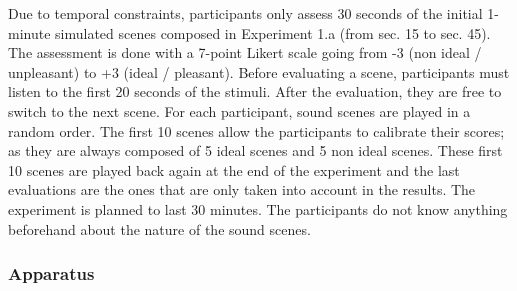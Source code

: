 \documentclass[twoside,twocolumn]{article}
\begin{document}
%
%
%

Due to temporal constraints, participants only assess 30 seconds of the initial 1-minute simulated scenes composed in Experiment 1.a (from sec. 15 to sec. 45).
The assessment is done with a 7-point Likert scale going from -3 (non ideal / unpleasant) to +3 (ideal / pleasant). Before evaluating a scene, participants must listen to the first 20 seconds of the stimuli. After the evaluation, they are free to switch to the next scene.
For each participant, sound scenes are played in a random order. The first 10 scenes allow the participants to calibrate their scores; as they are always composed of 5 ideal scenes and 5 non ideal scenes. These first 10 scenes are played back again at the end of the experiment and the last evaluations are the ones that are only taken into account in the results.
The experiment is planned to last 30 minutes. The participants do not know anything beforehand about the nature of the sound scenes.

\subsubsection*{Apparatus}

%
%
\end{document}
